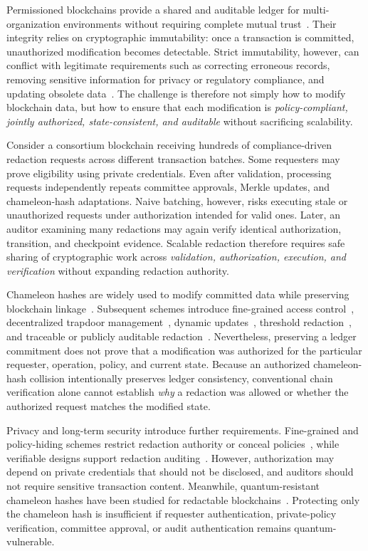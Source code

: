 \documentclass[lettersize,journal]{IEEEtran}
\begin{document}
Permissioned blockchains provide a shared and auditable ledger for
multi-organization environments without requiring complete mutual
trust~\cite{ref7}. Their integrity relies on cryptographic immutability:
once a transaction is committed, unauthorized modification becomes
detectable. Strict immutability, however, can conflict with legitimate
requirements such as correcting erroneous records, removing sensitive
information for privacy or regulatory compliance, and updating obsolete
data~\cite{ref9,ref21,ref22,ref38}. The challenge is therefore not
simply how to modify blockchain data, but how to ensure that each
modification is \emph{policy-compliant, jointly authorized,
state-consistent, and auditable} without sacrificing scalability.

Consider a consortium blockchain receiving hundreds of compliance-driven
redaction requests across different transaction batches. Some requesters
may prove eligibility using private credentials. Even after validation,
processing requests independently repeats committee approvals, Merkle
updates, and chameleon-hash adaptations. Naive batching, however, risks
executing stale or unauthorized requests under authorization intended
for valid ones. Later, an auditor examining many redactions may again
verify identical authorization, transition, and checkpoint evidence.
Scalable redaction therefore requires safe sharing of cryptographic work
across \emph{validation, authorization, execution, and verification}
without expanding redaction authority.

Chameleon hashes are widely used to modify committed data while
preserving blockchain linkage~\cite{ref1,ref2,ref6}. Subsequent
schemes introduce fine-grained access control~\cite{ref8,ref15},
decentralized trapdoor management~\cite{ref3,ref19}, dynamic
updates~\cite{ref5,ref16}, threshold redaction~\cite{ref27}, and
traceable or publicly auditable redaction~\cite{ref33,ref34,ref35}.
Nevertheless, preserving a ledger commitment does not prove that a
modification was authorized for the particular requester, operation,
policy, and current state. Because an authorized chameleon-hash
collision intentionally preserves ledger consistency, conventional
chain verification alone cannot establish \emph{why} a redaction was
allowed or whether the authorized request matches the modified state.

Privacy and long-term security introduce further requirements.
Fine-grained and policy-hiding schemes restrict redaction authority or
conceal policies~\cite{ref4,ref18,ref31,ref34}, while verifiable designs
support redaction auditing~\cite{ref13,ref20,ref33}. However,
authorization may depend on private credentials that should not be
disclosed, and auditors should not require sensitive transaction
content. Meanwhile, quantum-resistant chameleon hashes have been
studied for redactable blockchains~\cite{ref10,ref11,ref17,ref37}.
Protecting only the chameleon hash is insufficient if requester
authentication, private-policy verification, committee approval, or
audit authentication remains quantum-vulnerable.
\end{document}
